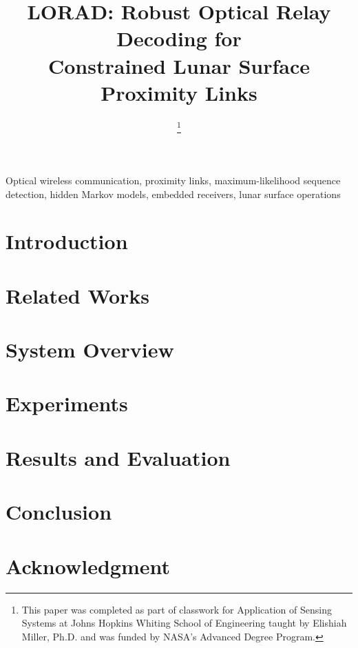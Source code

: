 \documentclass[conference]{IEEEtran}
\begin{document}
\graphicspath{{figures/}}

\title{LORAD: Robust Optical Relay Decoding for\\
Constrained Lunar Surface Proximity Links\\
}

\author{
\thanks{This paper was completed as part of classwork for Application of Sensing Systems at Johns Hopkins Whiting School of Engineering taught by Elishiah Miller, Ph.D. and was funded by NASA's Advanced Degree Program.}
}

\maketitle


\begin{abstract}

\end{abstract}

\begin{IEEEkeywords}
Optical wireless communication, proximity links, maximum-likelihood sequence detection, hidden Markov models, embedded receivers, lunar surface operations
\end{IEEEkeywords}

\section{Introduction}\label{introduction}


\section{Related Works}\label{related_works}


\section{System Overview}\label{system_overview}


\section{Experiments}\label{experiments}


\section{Results and Evaluation}\label{results}


\section{Conclusion}\label{conclusion}


\section*{Acknowledgment}




\end{document}
